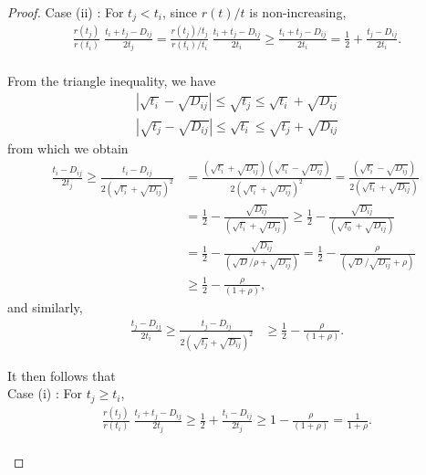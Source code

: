 \documentclass[10pt,a4paper]{amsart}
\begin{document}
\begin{proof}
  {Case (ii) \hspace{-1mm}:} For $t_j < t_i$, since $r(t)/t$ is non-increasing,
  \begin{align}
   \nonumber   \frac{r(t_j)}{r(t_i)}\; \frac{t_i + t_j - D_{ij}}{2t_j} =  \frac{r(t_j)/t_j}{r(t_i)/t_i} \; \frac{t_i + t_j - D_{ij}}{2t_i}  \geq \frac{t_i + t_j - D_{ij}}{2t_i} = \frac{1}{2} + \frac{t_j  - D_{ij}}{2t_i}.
  \end{align}
\\
From the triangle inequality, we have 
\begin{align}
    \label{triangle inequalities1}  |\sqrt{t_i} - \sqrt{D_{ij}}| \leq \sqrt{t_j} \leq  \sqrt{t_i} + \sqrt{D_{ij}} \\
    |\sqrt{t_j} - \sqrt{D_{ij}}| \leq \sqrt{t_i} \leq  \sqrt{t_j} + \sqrt{D_{ij}} 
    \label{triangle inequalities2}
\end{align}
from which we obtain
\begin{align*}
    \frac{t_i  - D_{ij}}{2t_j} \geq \frac{t_i  - D_{ij}}{2(\sqrt{t_i} + \sqrt{D_{ij}})^2}  & = \frac{(\sqrt{t_i} + \sqrt{D_{ij}})(\sqrt{t_i} - \sqrt{D_{ij}})}{2(\sqrt{t_i} + \sqrt{D_{ij}})^2}  = \frac{(\sqrt{t_i} - \sqrt{D_{ij}})}{2(\sqrt{t_i} + \sqrt{D_{ij}})}\;\\
    & = \frac{1}{2} - \frac{\sqrt{D_{ij}}}{(\sqrt{t_i} + \sqrt{D_{ij}})} \geq \frac{1}{2} - \frac{\sqrt{D_{ij}}}{(\sqrt{t_0} + \sqrt{D_{ij}})} \\
    & = \frac{1}{2} - \frac{\sqrt{D_{ij}}}{(\sqrt{D}/\rho + \sqrt{D_{ij}})} = \frac{1}{2} - \frac{\rho }{(\sqrt{D}/\sqrt{D_{ij}} + \rho)} \\
    & \geq \frac{1}{2} - \frac{\rho }{(1 + \rho)},
\end{align*}
and similarly,
\begin{align*}
    \frac{t_j  - D_{ij}}{2t_i} \geq \frac{t_j  - D_{ij}}{2(\sqrt{t_j} + \sqrt{D_{ij}})^2}  & \geq \frac{1}{2} - \frac{\rho }{(1 + \rho)}.
\end{align*}

It then follows that\\

{Case (i) \hspace{-1mm}:} For $t_j \geq t_i$, 
  \begin{align}
    \nonumber   \frac{r(t_j)}{r(t_i)}\; \frac{t_i + t_j - D_{ij}}{2t_j} \geq  \frac{1}{2} + \frac{t_i  - D_{ij}}{2t_j} \geq 1 - \frac{\rho }{(1 + \rho)} = \frac{1}{1 + \rho}.
  \end{align}
  \\
  

\end{proof}
\end{document}
